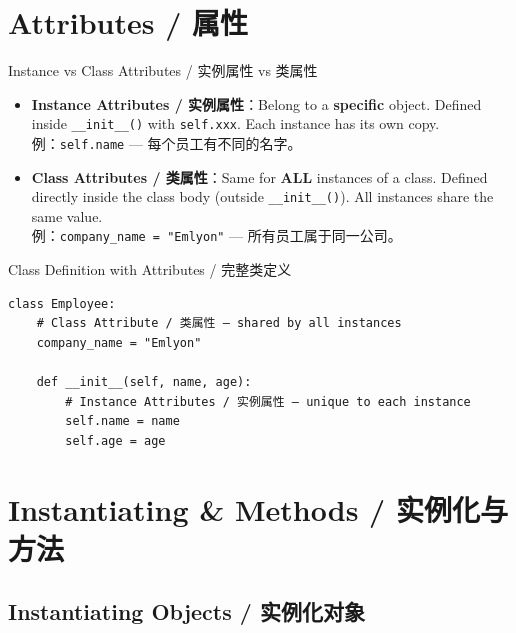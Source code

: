 \documentclass[11pt,a4paper]{report}
\let\oldtexttt\texttt
\renewcommand{\texttt}[1]{\textcolor{mainblue}{\oldtexttt{#1}}}
\begin{document}
\section{Attributes / 属性}

\begin{concept}{Instance vs Class Attributes / 实例属性 vs 类属性}
    \begin{itemize}[itemsep=0.8em]
        \item \textbf{Instance Attributes / 实例属性}：Belong to a \textbf{specific} object. Defined inside \texttt{\_\_init\_\_()} with \texttt{self.xxx}. Each instance has its own copy. \\
        例：\texttt{self.name} — 每个员工有不同的名字。
        \item \textbf{Class Attributes / 类属性}：Same for \textbf{ALL} instances of a class. Defined directly inside the class body (outside \texttt{\_\_init\_\_()}). All instances share the same value. \\
        例：\texttt{company\_name = "Emlyon"} — 所有员工属于同一公司。
    \end{itemize}
\end{concept}

\begin{examplebox}{Class Definition with Attributes / 完整类定义}
\begin{lstlisting}
class Employee:
    # Class Attribute / 类属性 — shared by all instances
    company_name = "Emlyon"

    def __init__(self, name, age):
        # Instance Attributes / 实例属性 — unique to each instance
        self.name = name
        self.age = age
\end{lstlisting}
\end{examplebox}

\section{Instantiating \& Methods / 实例化与方法}

\subsection{Instantiating Objects / 实例化对象}
\end{document}
